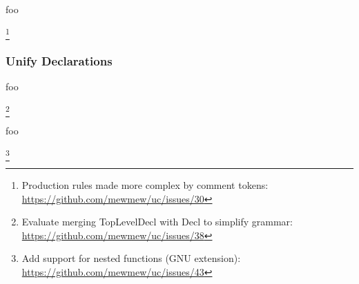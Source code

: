 
foo

\footnote{Production rules made more complex by comment tokens: \url{https://github.com/mewmew/uc/issues/30}}

\subsubsection{Unify Declarations}




foo

\footnote{Evaluate merging TopLevelDecl with Decl to simplify grammar: \url{https://github.com/mewmew/uc/issues/38}}

foo

%
%
%
%
%
%
%


\footnote{Add support for nested functions (GNU extension): \url{https://github.com/mewmew/uc/issues/43}}
